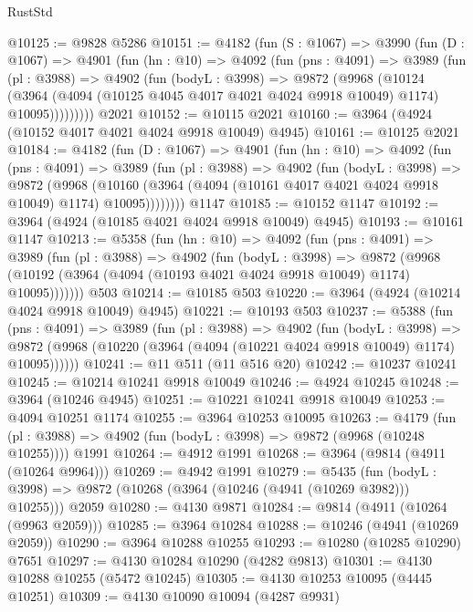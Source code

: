 \begin{lexlean}{RustStd}
\begin{coremodule}
{\begin{coremodule}
{{{{{{{{{{{{{{{{{{{{{{{{{{{{{{{{{{{{{{@10125 := @9828 @5286
@10151 := @4182
    (fun (S : @1067) =>
    @3990
      (fun (D : @1067) =>
      @4901
        (fun (hn : @10) =>
        @4092
          (fun (pns : @4091) =>
          @3989
            (fun (pl : @3988) =>
            @4902
              (fun (bodyL : @3998) =>
              @9872
                (@9968
                  (@10124
                    (@3964
                      (@4094 (@10125 @4045 @4017 @4021 @4024 @9918 @10049) @1174)
                      @10095)))))))))
    @2021
@10152 := @10115 @2021
@10160 := @3964 (@4924 (@10152 @4017 @4021 @4024 @9918 @10049) @4945)
@10161 := @10125 @2021
@10184 := @4182
    (fun (D : @1067) =>
    @4901
      (fun (hn : @10) =>
      @4092
        (fun (pns : @4091) =>
        @3989
          (fun (pl : @3988) =>
          @4902
            (fun (bodyL : @3998) =>
            @9872
              (@9968
                (@10160 (@3964 (@4094 (@10161 @4017 @4021 @4024 @9918 @10049) @1174) @10095))))))))
    @1147
@10185 := @10152 @1147
@10192 := @3964 (@4924 (@10185 @4021 @4024 @9918 @10049) @4945)
@10193 := @10161 @1147
@10213 := @5358
    (fun (hn : @10) =>
    @4092
      (fun (pns : @4091) =>
      @3989
        (fun (pl : @3988) =>
        @4902
          (fun (bodyL : @3998) =>
          @9872 (@9968 (@10192 (@3964 (@4094 (@10193 @4021 @4024 @9918 @10049) @1174) @10095)))))))
    @503
@10214 := @10185 @503
@10220 := @3964 (@4924 (@10214 @4024 @9918 @10049) @4945)
@10221 := @10193 @503
@10237 := @5388
    (fun (pns : @4091) =>
    @3989
      (fun (pl : @3988) =>
      @4902
        (fun (bodyL : @3998) =>
        @9872 (@9968 (@10220 (@3964 (@4094 (@10221 @4024 @9918 @10049) @1174) @10095))))))
@10241 := @11 @511 (@11 @516 @20)
@10242 := @10237 @10241
@10245 := @10214 @10241 @9918 @10049
@10246 := @4924 @10245
@10248 := @3964 (@10246 @4945)
@10251 := @10221 @10241 @9918 @10049
@10253 := @4094 @10251 @1174
@10255 := @3964 @10253 @10095
@10263 := @4179
    (fun (pl : @3988) => @4902 (fun (bodyL : @3998) => @9872 (@9968 (@10248 @10255))))
    @1991
@10264 := @4912 @1991
@10268 := @3964 (@9814 (@4911 (@10264 @9964)))
@10269 := @4942 @1991
@10279 := @5435
    (fun (bodyL : @3998) => @9872 (@10268 (@3964 (@10246 (@4941 (@10269 @3982))) @10255)))
    @2059
@10280 := @4130 @9871
@10284 := @9814 (@4911 (@10264 (@9963 @2059)))
@10285 := @3964 @10284
@10288 := @10246 (@4941 (@10269 @2059))
@10290 := @3964 @10288 @10255
@10293 := @10280 (@10285 @10290) @7651
@10297 := @4130 @10284 @10290 (@4282 @9813)
@10301 := @4130 @10288 @10255 (@5472 @10245)
@10305 := @4130 @10253 @10095 (@4445 @10251)
@10309 := @4130 @10090 @10094 (@4287 @9931)
}}}}}}}}}}}}}}}}}}}}}}}}}}}}}}}}}}}}}}
\end{coremodule}}
\end{coremodule}
\end{lexlean}
